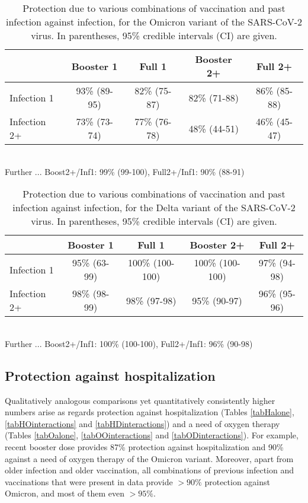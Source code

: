 \documentclass[preprint,12pt,authoryear]{elsarticle}
\begin{document}
\begin{table}[!h]
\caption{Protection due to various combinations of vaccination and past infection against infection, for the Omicron variant of the SARS-CoV-2 virus. In parentheses, 95\% credible intervals (CI) are given. \\[1ex]}
\label{tabIOinteractions}
\centering
\begin{tabular}{lcccc}
\hline
 & Booster 1 & Full 1 & Booster 2+ & Full 2+ \\
\hline
Infection 1 & 93\% (89-95) & 82\% (75-87) & 82\% (71-88) & 86\% (85-88) \\
Infection 2+ & 73\% (73-74) & 77\% (76-78) & 48\% (44-51) & 46\% (45-47) \\
\hline
\end{tabular} \\[1ex]
Further ... Boost2+/Inf1: 99\% (99-100), Full2+/Inf1: 90\% (88-91)
\end{table}

\begin{table}[!h]
\caption{Protection due to various combinations of vaccination and past infection against infection, for the Delta variant of the SARS-CoV-2 virus. In parentheses, 95\% credible intervals (CI) are given. \\[1ex]}
\label{tabIDinteractions}
\centering
\begin{tabular}{lcccc}
\hline
 & Booster 1 & Full 1 & Booster 2+ & Full 2+ \\
\hline
Infection 1 & 95\% (63-99) & 100\% (100-100) & 100\% (100-100) & 97\% (94-98) \\
Infection 2+ & 98\% (98-99) & 98\% (97-98) & 95\% (90-97) & 96\% (95-96) \\
\hline
\end{tabular} \\[1ex]
Further ... Boost2+/Inf1: 100\% (100-100), Full2+/Inf1: 96\% (90-98)
\end{table}

\subsection*{Protection against hospitalization}

Qualitatively analogous comparisons yet quantitatively consistently higher numbers arise as regards protection against hospitalization (Tables \ref{tabHalone}, \ref{tabHOinteractions} and \ref{tabHDinteractions}) and a need of oxygen therapy (Tables \ref{tabOalone}, \ref{tabOOinteractions} and \ref{tabODinteractions}).%
For example, recent booster dose provides 87\% protection against hospitalization and 90\% against a need of oxygen therapy of the Omicron variant. Moreover, apart from older infection and older vaccination, all combinations of previous infection and vaccinations that were present in data provide $>90\%$ protection against Omicron, and most of them even $>95\%$. 
\end{document}
